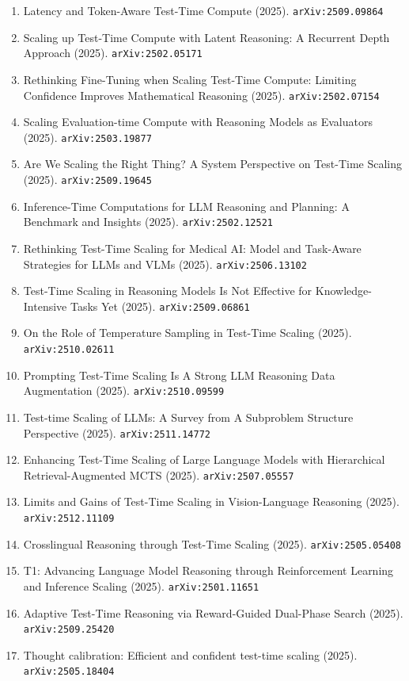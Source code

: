 \documentclass[11pt]{article}
\begin{document}
\begin{enumerate}
  \item Latency and Token-Aware Test-Time Compute (2025). \texttt{arXiv:2509.09864}
  \item Scaling up Test-Time Compute with Latent Reasoning: A Recurrent Depth
  Approach (2025). \texttt{arXiv:2502.05171}
  \item Rethinking Fine-Tuning when Scaling Test-Time Compute: Limiting Confidence Improves Mathematical Reasoning (2025). \texttt{arXiv:2502.07154}
  \item Scaling Evaluation-time Compute with Reasoning Models as Evaluators (2025). \texttt{arXiv:2503.19877}
  \item Are We Scaling the Right Thing? A System Perspective on Test-Time Scaling (2025). \texttt{arXiv:2509.19645}
  \item Inference-Time Computations for LLM Reasoning and Planning: A Benchmark
  and Insights (2025). \texttt{arXiv:2502.12521}
  \item Rethinking Test-Time Scaling for Medical AI: Model and Task-Aware Strategies for LLMs and VLMs (2025). \texttt{arXiv:2506.13102}
  \item Test-Time Scaling in Reasoning Models Is Not Effective for Knowledge-Intensive Tasks Yet (2025). \texttt{arXiv:2509.06861}
  \item On the Role of Temperature Sampling in Test-Time Scaling (2025). \texttt{arXiv:2510.02611}
  \item Prompting Test-Time Scaling Is A Strong LLM Reasoning Data Augmentation (2025). \texttt{arXiv:2510.09599}
  \item Test-time Scaling of LLMs: A Survey from A Subproblem Structure Perspective (2025). \texttt{arXiv:2511.14772}
  \item Enhancing Test-Time Scaling of Large Language Models with Hierarchical Retrieval-Augmented MCTS (2025). \texttt{arXiv:2507.05557}
  \item Limits and Gains of Test-Time Scaling in Vision-Language Reasoning (2025). \texttt{arXiv:2512.11109}
  \item Crosslingual Reasoning through Test-Time Scaling (2025). \texttt{arXiv:2505.05408}
  \item T1: Advancing Language Model Reasoning through Reinforcement Learning and Inference Scaling (2025). \texttt{arXiv:2501.11651}
  \item Adaptive Test-Time Reasoning via Reward-Guided Dual-Phase Search (2025). \texttt{arXiv:2509.25420}
  \item Thought calibration: Efficient and confident test-time scaling (2025). \texttt{arXiv:2505.18404}

\end{enumerate}
\end{document}
